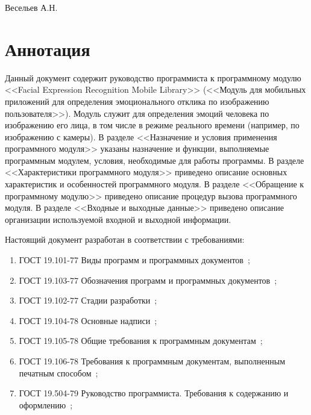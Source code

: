 \documentclass[a4paper,12pt]{article}
\begin{document}
    {Весельев А.Н.}
    \firstPage
    \newpage
    \annotation
    \section*{Аннотация}
    Данный документ содержит руководство программиста к программному модулю <<Facial Expression Recognition Mobile Library>> (<<Модуль для мобильных приложений для определения эмоционального отклика по изображению пользователя>>).
    Модуль служит для определения эмоций человека по изображению его лица, в том числе в режиме реального времени (например, по изображению с камеры).
    В разделе <<Назначение и условия применения программного модуля>> указаны назначение и функции, выполняемые программным модулем, условия, необходимые для работы программы.
    В разделе <<Характеристики программного модуля>> приведено описание основных характеристик и особенностей программного модуля.
    В разделе <<Обращение к программному модулю>> приведено описание процедур вызова программного модуля.
    В разделе <<Входные и выходные данные>> приведено описание организации используемой входной и выходной информации.

    Настоящий документ разработан в соответствии с требованиями:
    \begin{enumerate}
        \item ГОСТ 19.101-77 Виды программ и программных документов~\cite{gost1};
        \item ГОСТ 19.103-77 Обозначения программ и программных документов~\cite{gost2};
        \item ГОСТ 19.102-77 Стадии разработки~\cite{gost3};
        \item ГОСТ 19.104-78 Основные надписи~\cite{gost4};
        \item ГОСТ 19.105-78 Общие требования к программным документам~\cite{gost5};
        \item ГОСТ 19.106-78 Требования к программным документам, выполненным печатным способом~\cite{gost6};
        \item ГОСТ 19.504-79 Руководство программиста. Требования к содержанию и оформлению~\cite{gost8};
    \end{enumerate}
\end{document}
